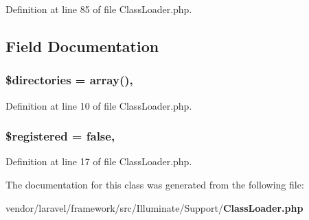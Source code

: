 Definition at line 85 of file Class\+Loader.\+php.



\subsection{Field Documentation}
\subsubsection[{\$directories}]{\setlength{\rightskip}{0pt plus 5cm}\$directories = array()\hspace{0.3cm}{\ttfamily [static]}, {\ttfamily [protected]}}\label{class_illuminate_1_1_support_1_1_class_loader_aca1cfea95d9874525c94ddc586b87633}


Definition at line 10 of file Class\+Loader.\+php.

\subsubsection[{\$registered}]{\setlength{\rightskip}{0pt plus 5cm}\$registered = false\hspace{0.3cm}{\ttfamily [static]}, {\ttfamily [protected]}}\label{class_illuminate_1_1_support_1_1_class_loader_a4832303f9bd07af05f1ec6874de46716}


Definition at line 17 of file Class\+Loader.\+php.



The documentation for this class was generated from the following file\+:\begin{DoxyCompactItemize}
\item 
vendor/laravel/framework/src/\+Illuminate/\+Support/{\bf Class\+Loader.\+php}\end{DoxyCompactItemize}
